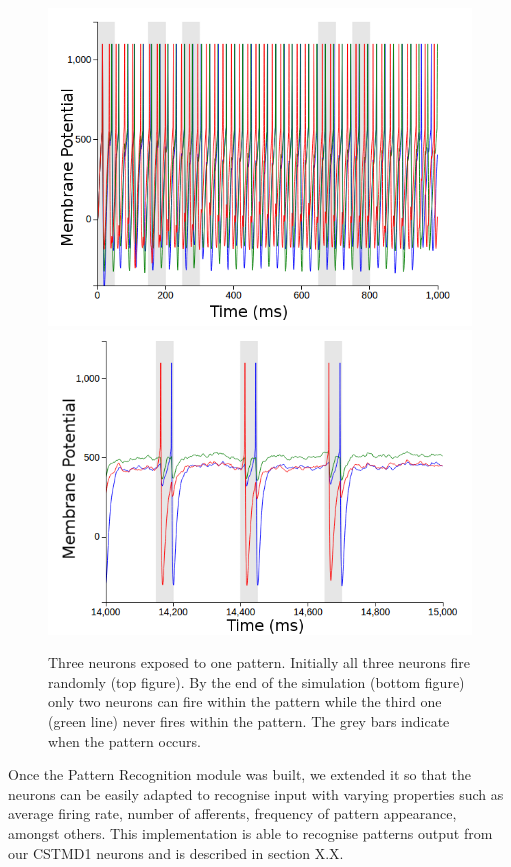 \documentclass[a4paper,11pt]{article}
\begin{document}
\begin{figure}[H]
\centering
\includegraphics[scale = 0.4]{n3_start}
\includegraphics[scale = 0.4]{n3_end}
\caption{Three neurons exposed to one pattern. Initially all three neurons fire randomly (top figure). By the end of the simulation (bottom figure) only two neurons can fire within the pattern while the third one (green line) never fires within the pattern. The grey bars indicate when the pattern occurs.}
\label{fig:3n1p}
\end{figure}


Once the Pattern Recognition module was built, we extended it so that the neurons can be easily adapted to recognise input with varying properties such as average firing rate, number of afferents, frequency of pattern appearance, amongst others. This implementation is able to recognise patterns output from our CSTMD1 neurons and is described in section X.X.
\end{document}

